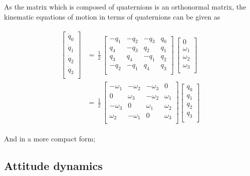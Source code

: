 As the matrix which is composed of quaternions is an orthonormal matrix, 
the kinematic equations of motion in terms of quaternions can be given as \cite{wie1998space}

\begin{align} \label{eqn:kinematicArrange}
\begin{split}
\begin{bmatrix}
\dot{q}_0\\[0.2em]
\dot{q}_1\\[0.2em]
\dot{q}_2\\[0.2em]
\dot{q}_3\\[0.2em]
\end{bmatrix}
& =\,
\frac{1}{2}
\,
\begin{bmatrix}
-q_1 & -q_2 & -q_3 & q_0 \\[0.2em]
q_4 & -q_3 & q_2 & q_1 \\[0.2em]
q_3 & q_4 & -q_1 & q_2 \\[0.2em]
-q_2 & -q_1 & q_4 & q_3 \\[0.2em]
\end{bmatrix}
\,
\begin{bmatrix}
0\\[0.2em]
\omega_1\\[0.2em]
\omega_2\\[0.2em]
\omega_3\\[0.2em]
\end{bmatrix} \\
& =\,
\frac{1}{2}
\,
\begin{bmatrix}
-\omega_1 & -\omega_2 & -\omega_3 & 0 \\[0.2em]
0 & \omega_3 & -\omega_2 & \omega_1 \\[0.2em]
-\omega_3 & 0 & \omega_1 & \omega_2 \\[0.2em]
\omega_2 & -\omega_1 & 0 & \omega_3 \\[0.2em]
\end{bmatrix}
\begin{bmatrix}
q_0\\[0.2em]
q_1\\[0.2em]
q_2\\[0.2em]
q_3\\[0.2em]
\end{bmatrix}
\end{split}
\end{align}

And in a more compact form;


\subsection{Attitude dynamics}

